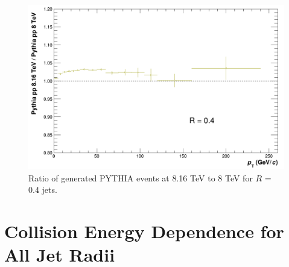 \begin{figure}[h!]
    \centering
    \includegraphics[width=\textwidth]{figures/ScaleFactorPythia/PythiaRatio_R04.png}
    \caption{Ratio of generated \pp PYTHIA events at 8.16 TeV to 8 TeV for $R$ = 0.4 jets.}
    \label{fig:appPythiaScaleFactorR04}
\end{figure}


\section{Collision Energy Dependence for All Jet Radii}\label{sec:appendixCollEnergyDep}

